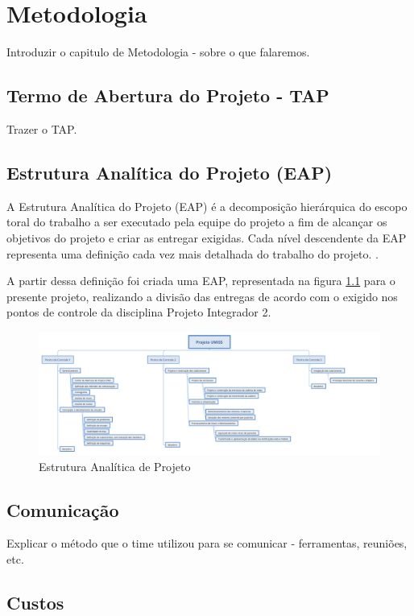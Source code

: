 \chapter{Metodologia}

Introduzir o capitulo de Metodologia - sobre o que falaremos.

\section{Termo de Abertura do Projeto - TAP}

Trazer o TAP.

\section{Estrutura Analítica do Projeto (EAP)}
A Estrutura Analítica do Projeto (EAP) é a decomposição hierárquica do escopo 
toral do trabalho a ser executado pela equipe do projeto a fim de alcançar
os objetivos do projeto e criar as entregar exigidas. Cada nível descendente 
da EAP representa uma definição cada vez mais detalhada do trabalho do 
projeto. \cite{pmbok}.

A partir dessa definição foi criada uma EAP, representada na figura \ref{fig:eap}
para o presente projeto, realizando 
a divisão das entregas de acordo com o exigido nos pontos de controle da 
disciplina Projeto Integrador 2.

\begin{figure}[H]
  \centering
    \includegraphics[width=450px]{figuras/eap.png}
  \caption{Estrutura Analítica de Projeto}
  \label{fig:eap}
\end{figure}

\section{Comunicação}

Explicar o método que o time utilizou para se comunicar - ferramentas, reuniões, etc.

\section{Custos}

